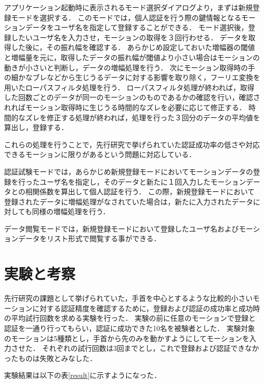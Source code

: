 \documentclass[11pt]{jarticle}
\begin{document}
アプリケーション起動時に表示されるモード選択ダイアログより，まずは新規登録モードを選択する．
このモードでは，個人認証を行う際の鍵情報となるモーションデータをユーザ名を指定して登録することができる．
モード選択後，登録したいユーザ名を入力させ，モーションの取得を３回行わせる．
データを取得した後に，その振れ幅を確認する．
あらかじめ設定しておいた増幅器の閾値と増幅量を元に，取得したデータの振れ幅が閾値より小さい場合はモーションの動きが小さいと判断し，データの増幅処理を行う．
次にモーション取得時の手の細かなブレなどから生じうるデータに対する影響を取り除く，フーリエ変換を用いたローパスフィルタ処理を行う．
ローパスフィルタ処理が終われば，取得した回数ごとのデータが同一のモーションのものであるかの確認を行い，確認されればモーション取得時に生じうる時間的なズレを必要に応じて修正する．
時間的なズレを修正する処理が終われば，処理を行った３回分のデータの平均値を算出し，登録する．

これらの処理を行うことで，先行研究で挙げられていた認証成功率の低さや対応できるモーションに限りがあるという問題に対応している．

認証試験モードでは，あらかじめ新規登録モードにおいてモーションデータの登録を行ったユーザ名を指定し，そのデータと新たに１回入力したモーションデータとの相関係数を算出して個人認証を行う．
この際，新規登録モードにおいて登録されたデータに増幅処理がなされていた場合は，新たに入力されたデータに対しても同様の増幅処理を行う．

データ閲覧モードでは，新規登録モードにおいて登録したユーザ名およびモーションデータをリスト形式で閲覧する事ができる．

\section{実験と考察}
先行研究の課題として挙げられていた，手首を中心とするような比較的小さいモーションに対する認証精度を確認するために，登録および認証の成功率と成功時の平均試行回数を求める実験を行った．
実験の前に任意のモーションで登録と認証を一通り行ってもらい，認証に成功できた10名を被験者とした．
実験対象のモーションは5種類とし，手首から先のみを動かすようにしてモーションを入力させた．
それぞれの試行回数は3回までとし，これで登録および認証できなかったものは失敗とみなした．

実験結果は以下の表\ref{result}に示すようになった．
\end{document}
